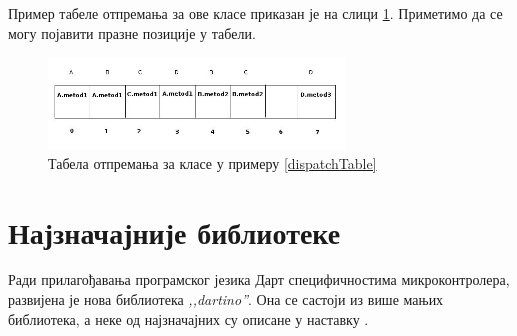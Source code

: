 \documentclass[12pt,oneside]{memoir}
\begin{document}
Пример табеле отпремања за ове класе приказан је на слици \ref{fig:otpremanje}. Приметимо да се могу појавити празне позиције у табели.

\begin{figure}[!ht]
  \centering
  \includegraphics[width=0.7\textwidth]{otpremanje.jpg}
  \caption{Табела отпремања за класе у примеру \ref{dispatchTable}}
  \label{fig:otpremanje}
\end{figure}

\section{Најзначајније библиотеке}
\label{biblioteke}
Ради прилагођавања програмског језика Дарт специфичностима микроконтролера, развијена је нова библиотека \textit{,,dartino''}. Она се састоји из више мањих библиотека, а неке од најзначајних су описане у наставку  \cite{biblioteke}.
\end{document}
